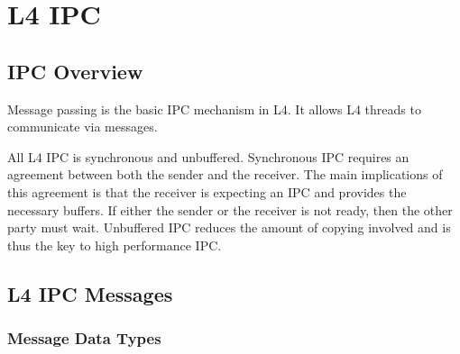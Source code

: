%



\chapter{\label{c:ipc}L4 IPC}



\section{IPC Overview}


Message passing is the basic IPC mechanism in L4. It allows L4 threads
to communicate via messages.

All L4 IPC is synchronous and unbuffered. Synchronous IPC requires an
agreement between both the sender and the receiver. The main
implications of this agreement is that the receiver is expecting an
IPC and provides the necessary buffers. If either the sender or the
receiver is not ready, then the other party must wait. Unbuffered IPC
reduces the amount of copying involved and is thus the key to high
performance IPC.


\section{L4 IPC Messages}



\subsection{Message Data Types}

